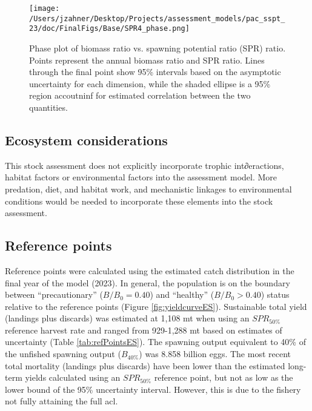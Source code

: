 \documentclass[11pt,
  letterpaper,
]{article}
\begin{document}
\begin{figure}
{\centering
\texttt{[image: /Users/jzahner/Desktop/Projects/assessment\_models/pac\_sspt\_23/doc/FinalFigs/Base/SPR4\_phase.png]}
}
\caption{Phase plot of biomass ratio vs. spawning potential ratio (SPR) ratio. Points represent the annual biomass ratio and SPR ratio. Lines through the final point show 95\% intervals based on the asymptotic uncertainty for each dimension, while the shaded ellipse is a 95\% region accoutninf for estimated correlation between the two quantities.\label{fig:phase_diagramES}}
\end{figure}
\clearpage

\hypertarget{ecosystem-considerations}{%
\subsection*{Ecosystem considerations}\label{ecosystem-considerations}}

This stock assessment does not explicitly incorporate trophic int∂eractions, habitat factors or environmental factors into the assessment model. More predation, diet, and habitat work, and mechanistic linkages to environmental conditions would be needed to incorporate these elements into the stock assessment.

\hypertarget{reference-points}{%
\subsection*{Reference points}\label{reference-points}}

Reference points were calculated using the estimated catch distribution in the final year of the model (2023). In general, the population is on the boundary between ``precautionary'' (\(B/B_0 = 0.40\)) and ``healthy'' (\(B/B_0 > 0.40\)) status relative to the reference points (Figure \ref{fig:yieldcurveES}). Sustainable total yield (landings plus discards) was estimated at 1,108 mt when using an \(SPR_{50\%}\) reference harvest rate and ranged from 929-1,288 mt based on estimates of uncertainty (Table \ref{tab:refPointsES}). The spawning output equivalent to 40\% of the unfished spawning output (\(B_{40\%}\)) was 8.858 billion eggs. The most recent total mortality (landings plus discards) have been lower than the estimated long-term yields calculated using an \(SPR_{50\%}\) reference point, but not as low as the lower bound of the 95\% uncertainty interval. However, this is due to the fishery not fully attaining the full \gls{acl}.
\end{document}
